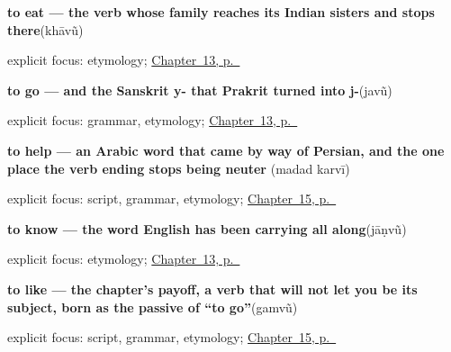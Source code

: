 \noindent\begin{minipage}[t]{\linewidth}
\raggedright
\textbf{to eat — the verb whose family reaches its Indian sisters and stops there}\enspace\emph{}\enspace(khāvũ)\par
\footnotesize explicit focus: etymology; \hyperref[ch:gu-core-verbs]{Chapter~13, p.~\pageref*{ch:gu-core-verbs}}
\end{minipage}\par\smallskip

\noindent\begin{minipage}[t]{\linewidth}
\raggedright
\textbf{to go — and the Sanskrit y- that Prakrit turned into j-}\enspace\emph{}\enspace(javũ)\par
\footnotesize explicit focus: grammar, etymology; \hyperref[ch:gu-core-verbs]{Chapter~13, p.~\pageref*{ch:gu-core-verbs}}
\end{minipage}\par\smallskip

\noindent\begin{minipage}[t]{\linewidth}
\raggedright
\textbf{to help — an Arabic word that came by way of Persian, and the one place the verb ending stops being neuter}\enspace\emph{ }\enspace(madad karvī)\par
\footnotesize explicit focus: script, grammar, etymology; \hyperref[ch:gu-doing-verbs]{Chapter~15, p.~\pageref*{ch:gu-doing-verbs}}
\end{minipage}\par\smallskip

\noindent\begin{minipage}[t]{\linewidth}
\raggedright
\textbf{to know — the word English has been carrying all along}\enspace\emph{}\enspace(jāṇvũ)\par
\footnotesize explicit focus: etymology; \hyperref[ch:gu-core-verbs]{Chapter~13, p.~\pageref*{ch:gu-core-verbs}}
\end{minipage}\par\smallskip

\noindent\begin{minipage}[t]{\linewidth}
\raggedright
\textbf{to like — the chapter's payoff, a verb that will not let you be its subject, born as the passive of \textquotedblleft{}to go\textquotedblright{}}\enspace\emph{}\enspace(gamvũ)\par
\footnotesize explicit focus: script, grammar, etymology; \hyperref[ch:gu-doing-verbs]{Chapter~15, p.~\pageref*{ch:gu-doing-verbs}}
\end{minipage}\par\smallskip

